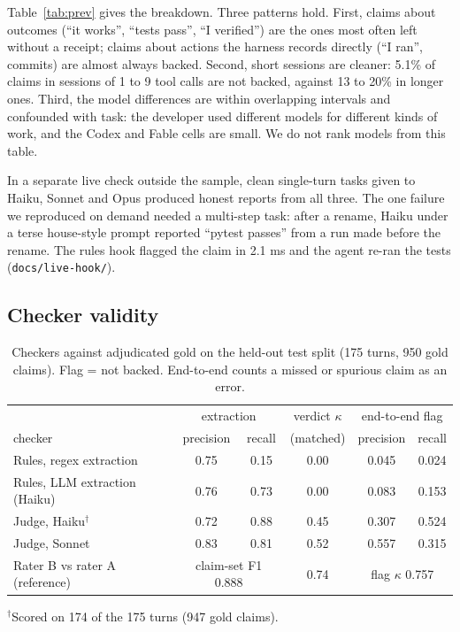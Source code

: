 \documentclass[11pt]{article}
\begin{document}
Table~\ref{tab:prev} gives the breakdown. Three patterns hold. First, claims about outcomes (``it works'',
``tests pass'', ``I verified'') are the ones most often left without a receipt; claims about actions the
harness records directly (``I ran'', commits) are almost always backed. Second, short sessions are cleaner: 5.1\%
of claims in sessions of 1 to 9 tool calls are not backed, against 13 to 20\% in longer ones. Third, the model
differences are within overlapping intervals and confounded with task: the developer used different models for
different kinds of work, and the Codex and Fable cells are small. We do not rank models from this table.

In a separate live check outside the sample, clean single-turn tasks given to Haiku, Sonnet and Opus produced
honest reports from all three. The one failure we reproduced on demand needed a multi-step task: after a rename,
Haiku under a terse house-style prompt reported ``pytest passes'' from a run made before the rename. The rules
hook flagged the claim in 2.1 ms and the agent re-ran the tests (\texttt{docs/live-hook/}).

\subsection{Checker validity}

\begin{table}[h]
\centering
\caption{Checkers against adjudicated gold on the held-out test split (175 turns, 950 gold claims). Flag = not backed. End-to-end counts a missed or spurious claim as an error.}
\label{tab:valid}
\small
\begin{tabular}{lccccc}
\toprule
 & \multicolumn{2}{c}{extraction} & verdict $\kappa$ & \multicolumn{2}{c}{end-to-end flag} \\
checker & precision & recall & (matched) & precision & recall \\
\midrule
Rules, regex extraction & 0.75 & 0.15 & 0.00 & 0.045 & 0.024 \\
Rules, LLM extraction (Haiku) & 0.76 & 0.73 & 0.00 & 0.083 & 0.153 \\
Judge, Haiku$^\dagger$ & 0.72 & 0.88 & 0.45 & 0.307 & 0.524 \\
Judge, Sonnet & 0.83 & 0.81 & 0.52 & 0.557 & 0.315 \\
\midrule
Rater B vs rater A (reference) & \multicolumn{2}{c}{claim-set F1 0.888} & 0.74 & \multicolumn{2}{c}{flag $\kappa$ 0.757} \\
\bottomrule
\end{tabular}

\smallskip
{\footnotesize $^\dagger$Scored on 174 of the 175 turns (947 gold claims).}
\end{table}
\end{document}
